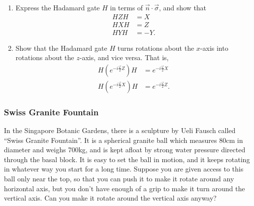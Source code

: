 \documentclass[fleqn]{article}
\begin{document}
\hypertarget{section-21}{%
\subsubsection{}\label{section-21}}

\begin{enumerate}
\def\labelenumi{\arabic{enumi}.}
\item
  Express the Hadamard gate \(H\) in terms of \(\vec{n}\cdot\vec{\sigma}\), and show that
  \[
    \begin{aligned}
   HZH&=X
    \\HXH&=Z
    \\HYH&=-Y.
    \end{aligned}
  \]
\item
  Show that the Hadamard gate \(H\) turns rotations about the \(x\)-axis into rotations about the \(z\)-axis, and vice versa.
  That is,
  \[
     \begin{aligned}
       H \left(
         e^{-i\frac{\varphi}{2}Z}
       \right) H
       &= e^{-i\frac{\varphi}{2}X}
     \\H \left(
         e^{-i\frac{\varphi}{2}X}
       \right) H
       &= e^{-i\frac{\varphi}{2}Z}.
     \end{aligned}
   \]
\end{enumerate}

\hypertarget{swiss-granite-fountain}{%
\subsubsection{Swiss Granite Fountain}\label{swiss-granite-fountain}}

In the Singapore Botanic Gardens, there is a sculpture by Ueli Fausch called ``Swiss Granite Fountain''.
It is a spherical granite ball which measures 80cm in diameter and weighs 700kg, and is kept afloat by strong water pressure directed through the basal block.
It is easy to set the ball in motion, and it keeps rotating in whatever way you start for a long time.
Suppose you are given access to this ball only near the top, so that you can push it to make it rotate around any horizontal axis, but you don't have enough of a grip to make it turn around the vertical axis.
Can you make it rotate around the vertical axis anyway?

\hypertarget{section-22}{%
\subsubsection{}\label{section-22}}
\end{document}
